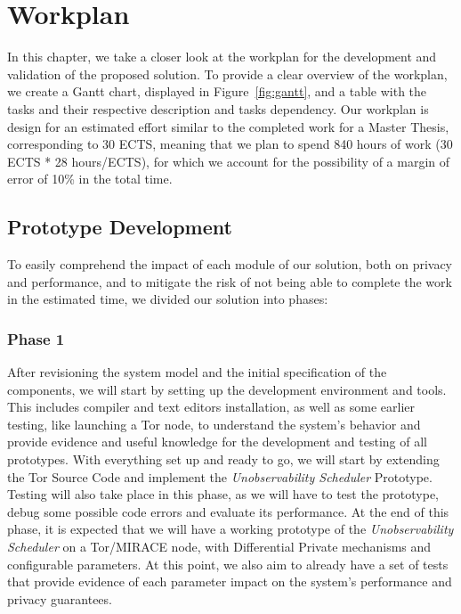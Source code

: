 
%

\chapter{Workplan}\label{cha:workplan}

In this chapter, we take a closer look at the workplan for the development and validation of the proposed solution.
To provide a clear overview of the workplan, we create a Gantt chart, displayed in Figure~\ref{fig:gantt}, and a table with the tasks and their respective description and tasks dependency. Our workplan is design for an estimated effort similar to the completed work for a Master Thesis, corresponding to 30 ECTS, meaning that we plan to spend 840 hours of work (30 ECTS * 28 hours/ECTS), for which we account for the possibility of a margin of error of 10\% in the total time. 

\section{Prototype Development}
To easily comprehend the impact of each module of our solution, both on privacy and performance, and to mitigate the risk of not being able to complete the work in the estimated time, we divided our solution into phases:

\subsection{Phase 1}
After revisioning the system model and the initial specification of the components, we will start by setting up the development environment and tools. This includes compiler and text editors installation, as well as some earlier testing, like launching a Tor node, to understand the system's behavior and provide evidence and useful knowledge for the development and testing of all prototypes. With everything set up and ready to go, we will start by extending the Tor Source Code and implement the \textit{Unobservability Scheduler} Prototype. Testing will also take place in this phase, as we will have to test the prototype, debug some possible code errors and evaluate its performance. At the end of this phase, it is expected that we will have a working prototype of the \textit{Unobservability Scheduler} on a Tor/MIRACE node, with Differential Private mechanisms and configurable parameters. At this point, we also aim to already have a set of tests that provide evidence of each parameter impact on the system's performance and privacy guarantees.

